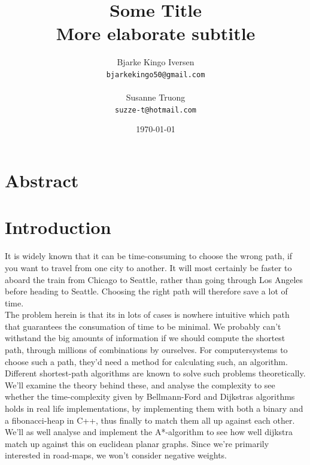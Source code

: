 \documentclass[11pt]{article}
\title{
  \vspace{3cm}
  \Huge{Some Title} \\
  \Large{More elaborate subtitle}
}
\author{
  \Large{Bjarke Kingo Iversen}
  \\ \texttt{bjarkekingo50@gmail.com} \\\\
  \Large{Susanne Truong}
  \\ \texttt{suzze-t@hotmail.com}
}
\date{
    \today
}
\def \ColourPDF {include/ku-farve}
\def \TitlePDF   {include/ku-en}  %
\begin{document}


\clearpage\maketitle
\thispagestyle{empty}

\newpage

\section{Abstract}
\newpage
\tableofcontents
\newpage
\section{Introduction}
It is widely known that it can be time-consuming to choose the wrong path, if you want to travel from one city to another. It will most certainly be faster to aboard the train from Chicago to Seattle, rather than going through Los Angeles before heading to Seattle. Choosing the right path will therefore save a lot of time.\\
The problem herein is that its in lots of cases is nowhere intuitive which path that guarantees the consumation of time to be minimal. We probably can't withstand the big amounts of information if we should compute the shortest path, through millions of combinations by ourselves. For computersystems to choose such a path, they'd need a method for calculating such, an algorithm.\\
Different shortest-path algorithms are known to solve such problems theoretically. We'll examine the theory behind these, and analyse the complexity to see whether the time-complexity given by Bellmann-Ford and Dijkstras algorithms holds in real life implementations, by implementing them with both a binary and a fibonacci-heap in C++, thus finally to match them all up against each other.\\
We'll as well analyse and implement the A*-algorithm to see how well dijkstra match up against this on euclidean planar graphs. Since we're primarily interested in road-maps, we won't consider negative weights.\\
\end{document}
